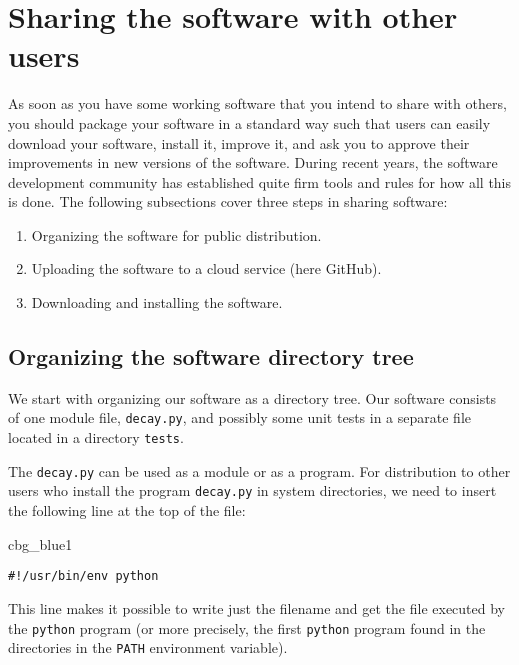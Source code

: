 \documentclass[graybox,sectrefs,envcountresetchap,open=right,final]{svmonodo}
\newenvironment{_cod_tight}[1]{
   \def\FrameCommand{\colorbox{#1}}
   \FrameRule0.6pt\MakeFramed {\FrameRestore}\vskip3mm}
   {\vskip0mm\endMakeFramed}
\newenvironment{cod}[1]{
\bgroup\rmfamily
\fboxsep=0mm\relax
\begin{_cod_tight}{#1}
\list{}{\parsep=-2mm\parskip=0mm\topsep=0pt\leftmargin=2mm
\rightmargin=2\leftmargin\leftmargin=4pt\relax}
\item\relax}
{\endlist\end{_cod_tight}\egroup}
\begin{document}
\section{Sharing the software with other users}
\label{softeng1:prog:se:git}

As soon as you have some working software that you intend to share
with others, you should package your software in a standard way such
that users can easily download your software, install it, improve it,
and ask you to approve their improvements in new versions of the software.
During recent years, the software development community has established
quite firm tools and rules for how all this is done. The following
subsections cover three steps in sharing software:

\begin{enumerate}
\item Organizing the software for public distribution.

\item Uploading the software to a cloud service (here GitHub).

\item Downloading and installing the software.
\end{enumerate}

\noindent
\subsection{Organizing the software directory tree}

We start with organizing our software as a directory tree. Our
software consists of one module file, \texttt{decay.py}, and possibly some
unit tests in a separate file located in a directory \texttt{tests}.

The \texttt{decay.py} can be used as a module or as a program. For distribution
to other users who install the program \texttt{decay.py} in system directories,
we need to insert the following line at the top of the file:

\begin{cod}{cbg_blue1}\begin{Verbatim}[numbers=none,fontsize=\fontsize{9pt}{9pt},baselinestretch=0.95,xleftmargin=2mm]
#!/usr/bin/env python
\end{Verbatim}
\end{cod}
\noindent
This line makes it possible to write just the filename and get the
file executed by the \texttt{python} program (or more precisely, the first
\texttt{python} program found in the directories in the \texttt{PATH} environment
variable).
\end{document}
